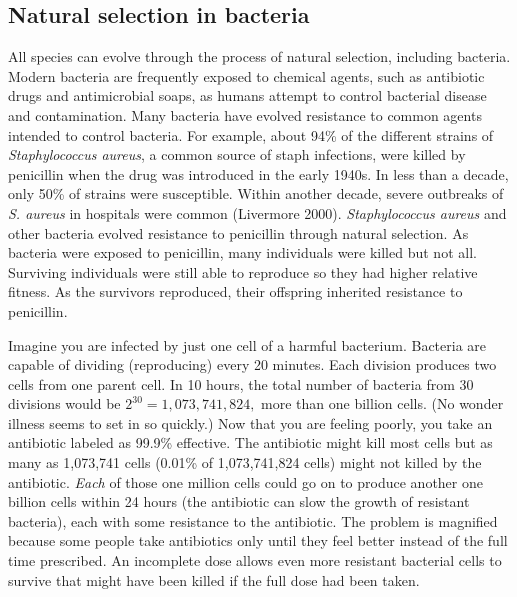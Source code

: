 \documentclass[12pt]{exam}
\begin{document}
\subsection*{Natural selection in bacteria}

All species can evolve through the process of natural selection, including bacteria. Modern bacteria are frequently exposed to chemical agents, such as antibiotic drugs and antimicrobial soaps, as humans attempt to control bacterial disease and contamination. Many bacteria have evolved resistance to common agents intended to control bacteria. For example, about 94\% of the different strains of \textit{Staphylococcus aureus}, a common source of staph infections, were killed by penicillin when the drug was introduced in the early 1940s. In less than a decade, only 50\% of strains were susceptible. Within another decade, severe outbreaks of \textit{S. aureus} in hospitals were common (Livermore 2000). \textit{Staphylococcus aureus} and other bacteria evolved resistance to penicillin through natural selection. As bacteria were exposed to penicillin, many individuals were killed but not all. Surviving individuals were still able to reproduce so they had higher relative fitness. As the survivors reproduced, their offspring inherited resistance to penicillin. 

Imagine you are infected by just one cell of a harmful bacterium. Bacteria are capable of dividing (reproducing) every 20 minutes. Each division produces two cells from one parent cell. In 10 hours, the total number of bacteria from 30 divisions would be $2^{30} = 1,073,741,824,$ more than one billion cells. (No wonder illness seems to set in so quickly.) Now that you are feeling poorly, you take an antibiotic labeled as 99.9\% effective. The antibiotic might kill most cells but as many as 1,073,741 cells (0.01\% of 1,073,741,824 cells) might not killed by the antibiotic. \emph{Each} of those one million cells could go on to produce another one billion cells within 24 hours (the antibiotic can slow the growth of resistant bacteria), each with some resistance to the antibiotic. The problem is magnified because some people take antibiotics only until they feel better instead of the full time prescribed. An incomplete dose allows even more resistant bacterial cells to survive that might have been killed if the full dose had been taken. 
\end{document}
